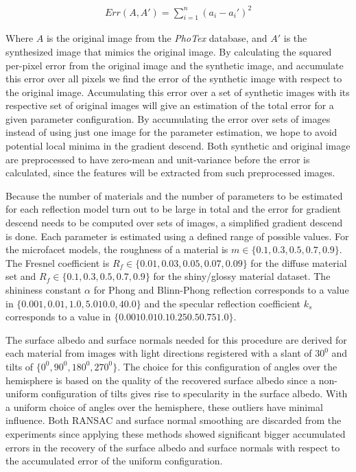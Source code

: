 		\begin{eqnarray*}
			Err(A,A') = \sum_{i=1}^n (a_i - a_i')^2
		\end{eqnarray*}
 
Where $A$ is the original image from the {\it PhoTex} database, and $A'$ is the synthesized image that mimics the original image. By calculating the squared per-pixel error from the original image and the synthetic image, and accumulate this error over all pixels we find the error of the synthetic image with respect to the original image. Accumulating this error over a set of synthetic images with its respective set of original images will give an estimation of the total error for a given parameter configuration. By accumulating the error over sets of images instead of using just one image for the parameter estimation, we hope to avoid potential local minima in the gradient descend. Both synthetic and original image are preprocessed to have zero-mean and unit-variance before the error is calculated, since the features will be extracted from such preprocessed images.

Because the number of materials and the number of parameters to be estimated for each reflection model turn out to be large in total and the error for gradient descend needs to be computed over sets of images, a simplified gradient descend is done. Each parameter is estimated using a defined range of possible values. For the microfacet models, the roughness of a material is $m \in \{0.1, 0.3, 0.5, 0.7, 0.9\}$. The Fresnel coefficient is $R_f \in \{0.01, 0.03, 0.05, 0.07, 0.09\}$ for the diffuse material set and $R_f \in \{0.1, 0.3, 0.5, 0.7, 0.9\}$ for the shiny/glossy material dataset. The shininess constant $\alpha$ for Phong and Blinn-Phong reflection corresponds to a value in $\{0.001, 0.01, 1.0, 5.0 10.0, 40.0\}$ and the specular reflection coefficient $k_s$ corresponds to a value in $\{0.001 0.01 0.1 0.25 0.5 0.75 1.0\}$. 

The surface albedo and surface normals needed for this procedure are derived for each material from images with light directions registered with a slant of $30^0$ and tilts of $\{0^0, 90^0, 180^0, 270^0\}$. The choice for this configuration of angles over the hemisphere is based on the quality of the recovered surface albedo since a non-uniform configuration of tilts gives rise to specularity in the surface albedo. With a uniform choice of angles over the hemisphere, these outliers have minimal influence. Both RANSAC and surface normal smoothing are discarded from the experiments since applying these methods showed significant bigger accumulated errors in the recovery of the surface albedo and surface normals with respect to the accumulated error of the uniform configuration.


